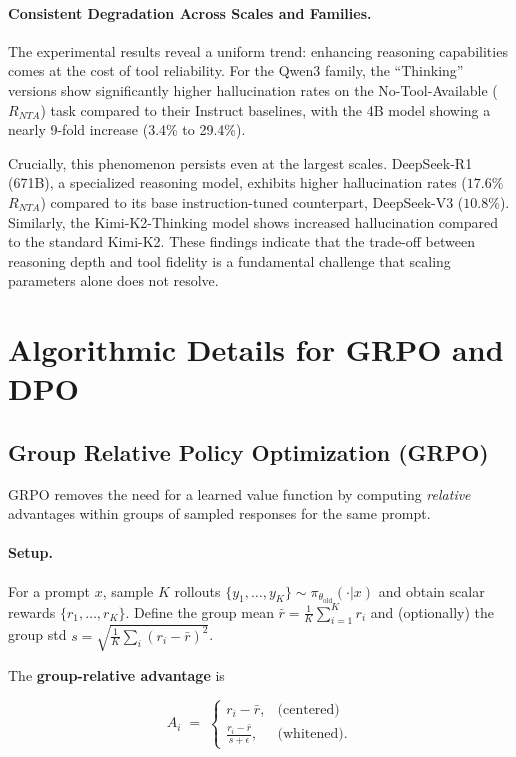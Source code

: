 \documentclass[11pt]{article}
\begin{document}
\paragraph{Consistent Degradation Across Scales and Families.}
The experimental results reveal a uniform trend: enhancing reasoning capabilities comes at the cost of tool reliability. For the Qwen3 family, the ``Thinking'' versions show significantly higher hallucination rates on the No-Tool-Available ($R_{NTA}$) task compared to their Instruct baselines, with the 4B model showing a nearly 9-fold increase (3.4\% to 29.4\%). 

Crucially, this phenomenon persists even at the largest scales. DeepSeek-R1 (671B), a specialized reasoning model, exhibits higher hallucination rates ($17.6\%$ $R_{NTA}$) compared to its base instruction-tuned counterpart, DeepSeek-V3 ($10.8\%$). Similarly, the Kimi-K2-Thinking model shows increased hallucination compared to the standard Kimi-K2. These findings indicate that the trade-off between reasoning depth and tool fidelity is a fundamental challenge that scaling parameters alone does not resolve.

\section{Algorithmic Details for GRPO and DPO}
\label{app:alg}

\subsection{Group Relative Policy Optimization (GRPO)}
\label{grpo}
GRPO removes the need for a learned value function by computing \emph{relative} advantages within groups of sampled responses for the same prompt.

\paragraph{Setup.} For a prompt $x$, sample $K$ rollouts $\{y_1,\dots,y_K\}\sim\pi_{\theta_{\mathrm{old}}}(\cdot|x)$ and obtain scalar rewards $\{r_1,\dots,r_K\}$. Define the group mean $\bar r=\frac{1}{K}\sum_{i=1}^{K} r_i$ and (optionally) the group std $s=\sqrt{\frac{1}{K}\sum_i (r_i-\bar r)^2}$. 

The \textbf{group-relative advantage} is

\[
A_i \;=\; 
\begin{cases}
r_i - \bar r, & \text{(centered)} \\
\frac{r_i - \bar r}{s+\epsilon}, & \text{(whitened).}
\end{cases}
\]
\end{document}
